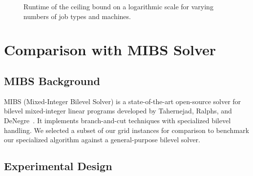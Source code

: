 \begin{figure}[htbp]
        \caption{Runtime of the ceiling bound on a logarithmic scale for varying numbers of job types and machines.}
        \label{fig:ceiling-runtime}
\end{figure}


\section{Comparison with MIBS Solver}

\subsection{MIBS Background}

MIBS (Mixed-Integer Bilevel Solver) is a state-of-the-art open-source solver for bilevel mixed-integer linear programs 
developed by Tahernejad, Ralphs, and DeNegre~\cite{Tahernejad2020}. It implements branch-and-cut techniques with specialized bilevel handling. We selected a subset of our grid instances for comparison to benchmark our specialized algorithm against a general-purpose bilevel solver.

\subsection{Experimental Design}

